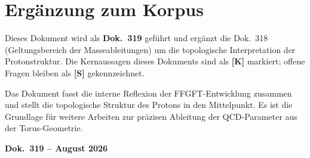 \documentclass[11pt,a4paper]{article}
\begin{document}
	\section*{Ergänzung zum Korpus}
	
	Dieses Dokument wird als \textbf{Dok.~319} geführt und ergänzt die Dok.~318 
	(Geltungsbereich der Masseableitungen) um die topologische Interpretation der Protonstruktur. 
	Die Kernaussagen dieses Dokuments sind als \textbf{[K]} markiert; 
	offene Fragen bleiben als \textbf{[S]} gekennzeichnet.
	
	Das Dokument fasst die interne Reflexion der FFGFT-Entwicklung zusammen und stellt die topologische Struktur des Protons in den Mittelpunkt. 
	Es ist die Grundlage für weitere Arbeiten zur präzisen Ableitung der QCD-Parameter aus der Torus-Geometrie.
	
	\medskip
	\noindent \textbf{Dok.~319 -- August 2026}
	
\end{document}
